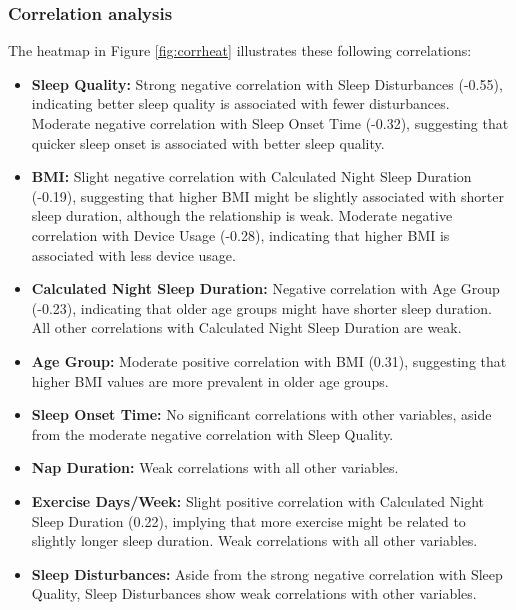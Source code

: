 \documentclass[conference]{IEEEtran}
\begin{document}
\subsubsection*{Correlation analysis}
The heatmap in Figure \ref{fig:corrheat} illustrates these following correlations:
\begin{itemize}

    \item \textbf{Sleep Quality:} Strong negative correlation with Sleep Disturbances (-0.55), indicating better sleep quality is associated with fewer disturbances.
          Moderate negative correlation with Sleep Onset Time (-0.32), suggesting that quicker sleep onset is associated with better sleep quality.

    \item \textbf{BMI:} Slight negative correlation with Calculated Night Sleep Duration (-0.19), suggesting that higher BMI might be slightly associated with shorter sleep duration, although the relationship is weak.
          Moderate negative correlation with Device Usage (-0.28), indicating that higher BMI is associated with less device usage.

    \item \textbf{Calculated Night Sleep Duration:} Negative correlation with Age Group (-0.23), indicating that older age groups might have shorter sleep duration.
          All other correlations with Calculated Night Sleep Duration are weak.

    \item \textbf{Age Group:} Moderate positive correlation with BMI (0.31), suggesting that higher BMI values are more prevalent in older age groups.

    \item \textbf{Sleep Onset Time:} No significant correlations with other variables, aside from the moderate negative correlation with Sleep Quality.

    \item \textbf{Nap Duration:} Weak correlations with all other variables.

    \item \textbf{Exercise Days/Week:} Slight positive correlation with Calculated Night Sleep Duration (0.22), implying that more exercise might be related to slightly longer sleep duration.
          Weak correlations with all other variables.

    \item \textbf{Sleep Disturbances:} Aside from the strong negative correlation with Sleep Quality, Sleep Disturbances show weak correlations with other variables.


\end{itemize}
\end{document}
